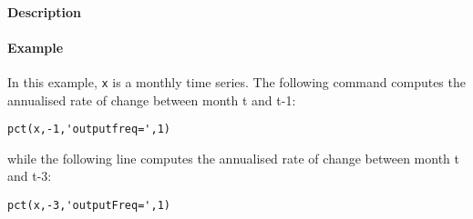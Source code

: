 \paragraph{Description}\label{description}

\paragraph{Example}\label{example}

In this example, \texttt{x} is a monthly time series. The following
command computes the annualised rate of change between month t and t-1:

\begin{verbatim}
pct(x,-1,'outputfreq=',1)
\end{verbatim}

while the following line computes the annualised rate of change between
month t and t-3:

\begin{verbatim}
pct(x,-3,'outputFreq=',1)
\end{verbatim}


